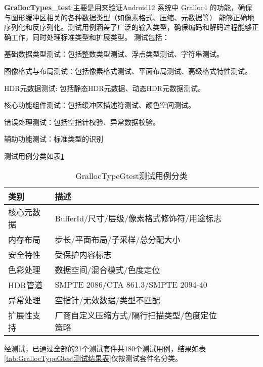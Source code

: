 \textbf{GrallocTypes\_test}:主要是用来验证Android12 系统中 Gralloc4 的功能，确保与图形缓冲区相关的各种数据类型（如像素格式、压缩、元数据等）
能够正确地序列化和反序列化。测试用例涵盖了广泛的输入类型，确保编码和解码过程能够正确工作，同时处理标准类型和扩展类型。
测试包括：

    基础数据类型测试：包括整数类型测试、浮点类型测试、字符串测试。

    图像格式与布局测试：包括像素格式测试、平面布局测试、高级格式特性测试。

    HDR元数据测试: 包括静态HDR元数据、动态HDR元数据测试。

    核心功能组件测试：包括缓冲区描述符测试、颜色空间测试。

    错误处理测试：包括空指针校验、异常数据校验。
    
    辅助功能测试：标准类型的识别

测试用例分类如表\ref{tab:GrallocTypeGtest测试用例分类}

\begin{table}[h]
    \centering
    \caption{GrallocTypeGtest测试用例分类}
    \label{tab:GrallocTypeGtest测试用例分类}
    \begin{tabular}{llllll}
      \toprule
      类别 & 描述  \\
      \midrule
      核心元数据 & BufferId/尺寸/层级/像素格式修饰符/用途标志  \\
      内存布局 & 步长/平面布局/子采样/总分配大小 \\
      安全特性 & 受保护内容标志 \\
      色彩处理 & 数据空间/混合模式/色度定位 \\
      HDR管道 & SMPTE 2086/CTA 861.3/SMPTE 2094-40 \\
      异常处理 & 空指针/无效数据/类型不匹配 \\
      扩展性支持 & 厂商自定义压缩方式/隔行扫描类型/色度定位策略 \\
      \bottomrule
    \end{tabular}
    \note{}
\end{table}

经测试，已通过全部的21个测试套件共180个测试用例，结果如表\ref{tab:GrallocTypeGtest测试结果表}仅按测试套件名分类。

